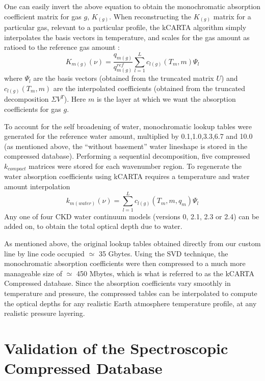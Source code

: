 \documentclass[11pt]{article}
\begin{document}
One can easily invert the above equation to obtain the monochromatic
absorption coefficient matrix for gas $g$, $K_{(g)}$.  When
reconstructing the $K_{(g)}$ matrix for a particular gas, relevant to
a particular profile, the \textsf{kCARTA} algorithm simply interpolates
the basis vectors in temperature, and scales for the gas amount as
ratioed to the reference gas amount :
\begin{equation}
K_{m(g)}(\nu) = \frac{q_{m(g)}}{q^{ref}_{m(g)}}
                \sum_{l=1}^{L} c_{l(g)}(T_{m},m) \Psi_{l}
\end{equation}
where $\Psi_{l}$ are the basis vectors (obtained from the truncated
matrix $U$) and $ c_{l(g)}(T_{m},m)$ are the interpolated coefficients
(obtained from the truncated decomposition $\Sigma V^{T}$). Here $m$
is the layer at which we want the absorption coefficients for gas $g$.

To account for the self broadening of water, monochromatic lookup tables were 
generated for the reference water amount,  multiplied by 0.1,1.0,3.3,6.7 and 
10.0 (as mentioned above, the ``without basement'' water lineshape is stored 
in the compressed database). Performing a sequential decomposition,
five compressed $k_{compact}$ matrices were stored for each wavenumber 
region.  To regenerate the water absorption coefficients using \textsf{kCARTA}
requires a temperature and water amount interpolation
\begin{equation}
k_{m(water)}(\nu) = \sum_{l=1}^{L} c_{l(g)}(T_{m},m,q_{m}) \Psi_{l}
\end{equation}
Any one of four CKD water continuum models  (versions 0, 2.1, 2.3 or 2.4) 
can be added on, to obtain the total optical depth due to water. 

As mentioned above, the original lookup tables obtained directly from our 
custom line by line code occupied $\simeq$ 35 Gbytes. Using the SVD technique,
the monochromatic absorption coefficients were then compressed to a much more 
manageable size of $\simeq$ 450 Mbytes, which is what is referred to as the 
\textsf{kCARTA} Compressed database. Since the absorption coefficients vary 
smoothly in temperature and pressure, the compressed tables can be interpolated
to compute the optical depths for any realistic Earth atmosphere temperature 
profile, at any realistic pressure layering. 

\section{Validation of the Spectroscopic Compressed Database}
\end{document}

